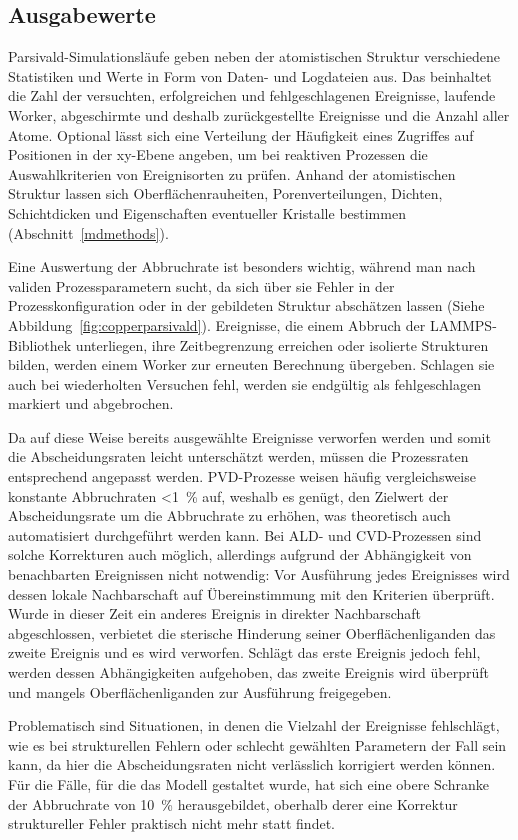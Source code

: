 
\subsection{Ausgabewerte}

Parsivald-Simulationsläufe geben neben der atomistischen Struktur verschiedene Statistiken und Werte in Form von Daten- und Logdateien aus.
Das beinhaltet die Zahl der versuchten, erfolgreichen und fehlgeschlagenen Ereignisse, laufende Worker, abgeschirmte und deshalb zurückgestellte Ereignisse und die Anzahl aller Atome.
Optional lässt sich eine Verteilung der Häufigkeit eines Zugriffes auf Positionen in der xy-Ebene angeben, um bei reaktiven Prozessen die Auswahlkriterien von Ereignisorten zu prüfen.
Anhand der atomistischen Struktur lassen sich Oberflächenrauheiten, Porenverteilungen, Dichten, Schichtdicken und Eigenschaften eventueller Kristalle bestimmen (Abschnitt~\ref{mdmethods}).

Eine Auswertung der Abbruchrate ist besonders wichtig, während man nach validen Prozessparametern sucht, da sich über sie Fehler in der Prozesskonfiguration oder in der gebildeten Struktur abschätzen lassen (Siehe Abbildung~\ref{fig:copperparsivald}).
Ereignisse, die einem Abbruch der LAMMPS-Bibliothek unterliegen, ihre Zeitbegrenzung erreichen oder isolierte Strukturen bilden, werden einem Worker zur erneuten Berechnung übergeben.
Schlagen sie auch bei wiederholten Versuchen fehl, werden sie endgültig als fehlgeschlagen markiert und abgebrochen.

Da auf diese Weise bereits ausgewählte Ereignisse verworfen werden und somit die Abscheidungsraten leicht unterschätzt werden, müssen die Prozessraten entsprechend angepasst werden.
PVD-Prozesse weisen häufig vergleichsweise konstante Abbruchraten \SI{<1}{\percent} auf, weshalb es genügt, den Zielwert der Abscheidungsrate um die Abbruchrate zu erhöhen, was theoretisch auch automatisiert durchgeführt werden kann.
Bei ALD- und CVD-Prozessen sind solche Korrekturen auch möglich, allerdings aufgrund der Abhängigkeit von benachbarten Ereignissen nicht notwendig:
Vor Ausführung jedes Ereignisses wird dessen lokale Nachbarschaft auf Übereinstimmung mit den Kriterien überprüft.
Wurde in dieser Zeit ein anderes Ereignis in direkter Nachbarschaft abgeschlossen, verbietet die sterische Hinderung seiner Oberflächenliganden das zweite Ereignis und es wird verworfen.
Schlägt das erste Ereignis jedoch fehl, werden dessen Abhängigkeiten aufgehoben, das zweite Ereignis wird überprüft und mangels Oberflächenliganden zur Ausführung freigegeben.

Problematisch sind Situationen, in denen die Vielzahl der Ereignisse fehlschlägt, wie es bei strukturellen Fehlern oder schlecht gewählten Parametern der Fall sein kann, da hier die Abscheidungsraten nicht verlässlich korrigiert werden können.
Für die Fälle, für die das Modell gestaltet wurde, hat sich eine obere Schranke der Abbruchrate von \SI{10}{\percent} herausgebildet, oberhalb derer eine Korrektur struktureller Fehler praktisch nicht mehr statt findet.
